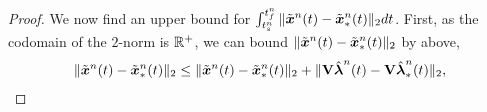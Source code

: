\begin{proof}
\begin{comment}
&\adjointROMSolArgt{n}{\timeEndArg{n}} = \boldsymbol 0 .  \end{align*}
\begin{align*} 
&\frac{d}{dt} \genstateROMStarSolArg{n}   -
\basisspace^T  \velocity(\basisspace \genstateROMStarSolArg{n} + \stateIntercept,t) =  \adjointROMStarSolArg{n} , \\
 &\frac{d}{dt} \adjointROMStarSolArg{n} + \basisspace^T \bigg[\frac{\partial
\velocity}{\partial \stateyDiscrete}(\basisspace \genstateROMStarSolArg{n} +
\stateIntercept,t)\bigg]^T \basisspace \adjointROMStarSolArg{n} = \basisspace^T \bigg[
\frac{\partial \velocity}{\partial \stateyDiscrete} (\basisspace \genstateROMStarSolArg{n} +
\stateIntercept,t) \bigg]^T \bigg( \mathbf{I} -   \basisspace \basisspace^T
\bigg)    \velocity(\basisspace \genstateROMStarSolArg{n} + \stateIntercept,t) , \\  
& \genstateROMStarSolArgt{n}{\timeStartArg{n}} =
\begin{cases} \genstateROMStarSolArgt{n-1}{\timeEndArg{n-1}} & n=2,\ldots,\nslabs, \\
\basisspace^T(\approxstateIC - \stateIntercept) & n=1, \end{cases}\\
&\adjointROMStarSolArgt{n}{\timeEndArg{n}} = \boldsymbol 0 .  \end{align*}
\end{comment}
We now find an upper bound for $\int_{t_s^{n}}^{t_f^{n}} \| \tilde{\boldsymbol x}^{n}(t) - \tilde{\boldsymbol x}_{*}^{n}(t) \|_2 dt$. 
First, as the codomain of the $2$-norm is $\mathbb{R}^{+}$, we can bound $\| \tilde{\boldsymbol x}^{n}(t) - \tilde{\boldsymbol x}_{*}^{n}(t) \|_2$ by above,
\begin{align*}
\norm{\stateROMSolArgt{n}{t} - \stateROMStarSolArgt{n}{t}} &\le  \norm{\stateROMSolArgt{n}{t} - \stateROMStarSolArgt{n}{t}} + \norm{\basisspace \adjointROMSolArgt{n}{t} - 
\basisspace \adjointROMStarSolArgt{n}{t} } , \\

\end{align*}
\end{proof}
